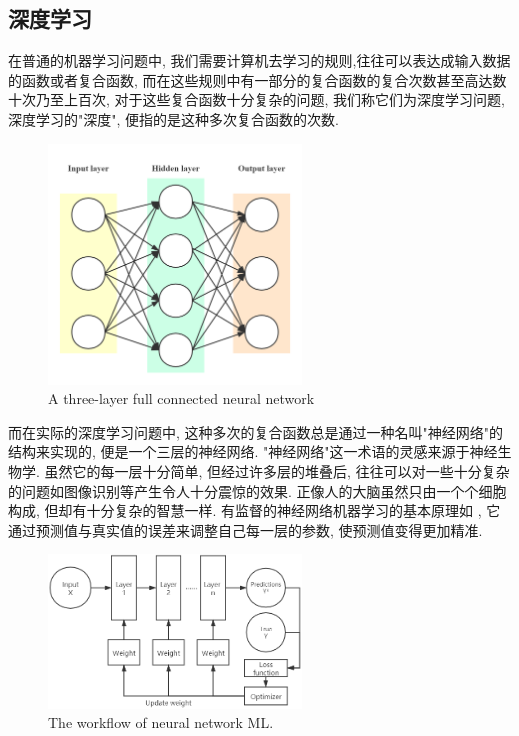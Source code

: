 \documentclass[lang=cn,11pt,a4paper]{elegantpaper}
\begin{document}
\subsection{深度学习}
\par 在普通的机器学习问题中, 我们需要计算机去学习的规则,往往可以表达成输入数据的函数或者复合函数, 而在这些规则中有一部分的复合函数的复合次数甚至高达数十次乃至上百次, 对于这些复合函数十分复杂的问题, 我们称它们为深度学习问题, 深度学习的"深度", 便指的是这种多次复合函数的次数. 
\begin{figure}[htbp]
	\centering
	\includegraphics[width=0.6\textwidth]{DNN}
  	\caption{A three-layer full connected neural network\label{fig:DNN}}
\end{figure}
\par 而在实际的深度学习问题中, 这种多次的复合函数总是通过一种名叫"神经网络"的结构来实现的,  便是一个三层的神经网络. "神经网络"这一术语的灵感来源于神经生物学. 虽然它的每一层十分简单, 但经过许多层的堆叠后, 往往可以对一些十分复杂的问题如图像识别等产生令人十分震惊的效果. 正像人的大脑虽然只由一个个细胞构成, 但却有十分复杂的智慧一样. 有监督的神经网络机器学习的基本原理如 , 它通过预测值与真实值的误差来调整自己每一层的参数, 使预测值变得更加精准.
\begin{figure}[htbp]
	\centering
	\hspace{-30pt}\includegraphics[width=0.6\textwidth]{Net}
  	\caption{The workflow of neural network ML.\label{fig:net}}
\end{figure}
\end{document}
